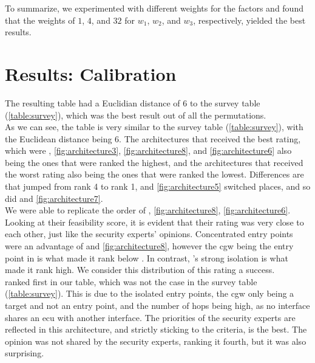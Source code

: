 To summarize, we experimented with different weights for the factors and found that the weights of 
$1$, $4$, and $32$ for $w_{1}$, $w_{2}$, and $w_{3}$, respectively, yielded the best results.


\section{Results: Calibration}
\label{sec:calibration}

The resulting table had a Euclidian distance of 6 to the survey table (\ref{table:survey}), which was the best result out of all the permutations.\\

As we can see, the table is very similar to the survey table (\ref{table:survey}), with the Euclidean distance being 6.
The architectures that received the best rating, which were 
, \ref{fig:architecture3}, \ref{fig:architecture8}, and \ref{fig:architecture6} 
also being the ones that were ranked the highest,
and the architectures that received the worst rating also being the ones that were ranked the lowest.
Differences are that  jumped from rank 4 to rank 1,  and \ref{fig:architecture5} switched places, 
and so did  and \ref{fig:architecture7}.\\

We were able to replicate the order of , \ref{fig:architecture8}, \ref{fig:architecture6}.
Looking at their feasibility score, it is evident that their rating was very close to each other, just like the security experts' opinions.
Concentrated entry points were an advantage of  and \ref{fig:architecture8}, 
however the \acrshort{cgw} being the entry point in  is what made it rank below .
In contrast, 's strong isolation is what made it rank high.
We consider this distribution of this rating a success.\\

 ranked first in our table, which was not the case in the survey table (\ref{table:survey}).
This is due to the isolated entry points, the \acrshort{cgw} only being a target and not an entry point, 
and the number of hops being high, as no interface shares an \acrshort{ecu} with another interface.
The priorities of the security experts are reflected in this architecture, and
strictly sticking to the criteria,  is the best.
The opinion was not shared by the security experts, ranking it fourth, but it was also surprising.\\

